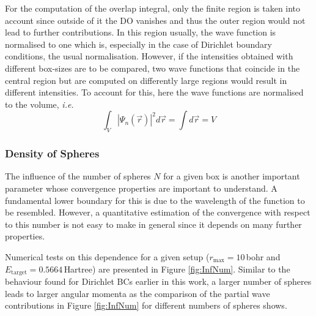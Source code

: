 For the computation of the overlap integral, only the finite region is taken into account since outside of it the DO vanishes and thus the outer region would not lead to further contributions.
In this region usually, the wave function is normalised to one which is, especially in the case of Dirichlet boundary conditions, the usual normalisation.
However, if the intensities obtained with different box-sizes are to be compared, two wave functions that coincide in the central region but are computed on differently large regions would result in different intensities.
To account for this, here the wave functions are normalised to the volume, \textit{i.e.}
\begin{equation}
\int_V \left|\Psi_n (\vec{r})\right|^2d\vec{r}=\int d\vec{r}=V
\end{equation}

\subsubsection{Density of Spheres}
\label{sec:BenchSphere}
The influence of the number of spheres $N$ for a given box is another important parameter whose convergence properties are important to understand.
A fundamental lower boundary for this is due to the wavelength of the function to be resembled.
However, a quantitative estimation of the convergence with respect to this number is not easy to make in general since it depends on many further properties.

Numerical tests on this dependence for a given setup ($r_\text{max}=10\,$bohr and $E_\text{target}=0.5664\,$Hartree) are presented in Figure \ref{fig:InfNum}.
Similar to the behaviour found for Dirichlet BCs earlier in this work, a larger number of spheres leads to larger angular momenta as the comparison of the partial wave contributions in Figure \ref{fig:InfNum} for different numbers of spheres shows.

